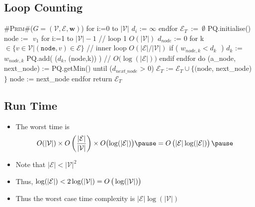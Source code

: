 \begin{slide}
\section[-2.4]{Loop Counting}

\begin{pseudo}
#\textsc{Prim}#($G=(\mathcal{V},\mathcal{E}, \bm{w})$) {
   for i:=0 to $|\mathcal{V}|$
      $d_i$ := $\infty$ 
   endfor
   $\mathcal{E}_T\,$ := $\,\emptyset$
   PQ.initialise()
   node := $\,\,v_1$
   for i:=1 to $|\mathcal{V}|-1$                            // loop 1  $O(|\mathcal{V}|)$
      $d_{node}$ := 0
      for k $\in \{v\in\mathcal{V}| (\mathtt{node},v)\in\mathcal{E}\}$                       // inner loop $O(|\mathcal{E}|/|\mathcal{V}|)$
         if ( $w_{node,k} < d_{k}\,\,$  )
            $d_{k}$ := $w_{node,k}$
            PQ.add( ($d_{k}$, (node,k)) )              // $O\bigl(\log(|\mathcal{E}|)\bigr)$
         endif
      endfor
      do
         (a_node, next_node) := PQ.getMin()
      until ($d_{next\_node}$  > 0)
      $\mathcal{E}_T$ := $\mathcal{E}_T \cup \{($node, next_node)$\}$
      node := next_node
   endfor
   return $\mathcal{E}_T$
}
\end{pseudo}
\vspace*{-1cm}
\end{slide}


\begin{slide}
\section{Run Time}

\begin{PauseHighLight}
  \begin{itemize}
  \item The worst time is
    \begin{align*}
      O(|\mathcal{V}|) \times
      O\left(\frac{|\mathcal{E}|}{|\mathcal{V}|}\right) \times
      O\bigl(\log(|\mathcal{E}|)\bigr)\pause = O\left(\strut
      |\mathcal{E}|\log(|\mathcal{E}|)\right)\pause
    \end{align*}
    \item Note that  $|\mathcal{E}| < |\mathcal{V}|^2$\pause
    \item Thus, $\log(|\mathcal{E}|) <
       2 \log(|\mathcal{V}|) = O\left(\strut
        \log(|\mathcal{V}|) \right)$\pause
    \item Thus the worst case time complexity is $|\mathcal{E}|
    \log(|\mathcal{V}|)$\pause
  \end{itemize}
\end{PauseHighLight}

\end{slide}


